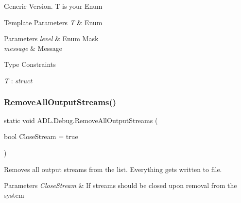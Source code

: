Generic Version. T is your Enum 


\begin{DoxyTemplParams}{Template Parameters}
{\em T} & Enum\\
\hline
\end{DoxyTemplParams}

\begin{DoxyParams}{Parameters}
{\em level} & Enum Mask\\
\hline
{\em message} & Message\\
\hline
\end{DoxyParams}
\begin{Desc}
\item[Type Constraints]\begin{description}
\item[{\em T} : {\em struct}]\end{description}
\end{Desc}
\mbox{\label{class_a_d_l_1_1_debug_adae2e77eb29191dc812b8875bd1ebd57}} 
\subsubsection{\texorpdfstring{Remove\+All\+Output\+Streams()}{RemoveAllOutputStreams()}}
{\footnotesize\ttfamily static void A\+D\+L.\+Debug.\+Remove\+All\+Output\+Streams (\begin{DoxyParamCaption}\item[{bool}]{Close\+Stream = {\ttfamily true} }\end{DoxyParamCaption})\hspace{0.3cm}{\ttfamily [static]}}



Removes all output streams from the list. Everything gets written to file. 


\begin{DoxyParams}{Parameters}
{\em Close\+Stream} & If streams should be closed upon removal from the system\\
\hline
\end{DoxyParams}
\mbox{\label{class_a_d_l_1_1_debug_a55a298962d5f05d55c5b3b045e7f6fe7}} 
